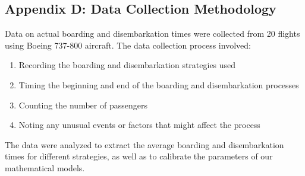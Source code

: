 \subsection{Appendix D: Data Collection Methodology}

Data on actual boarding and disembarkation times were collected from 20 flights using Boeing 737-800 aircraft. The data collection process involved:

\begin{enumerate}
    \item Recording the boarding and disembarkation strategies used
    \item Timing the beginning and end of the boarding and disembarkation processes
    \item Counting the number of passengers
    \item Noting any unusual events or factors that might affect the process
\end{enumerate}

The data were analyzed to extract the average boarding and disembarkation times for different strategies, as well as to calibrate the parameters of our mathematical models.

